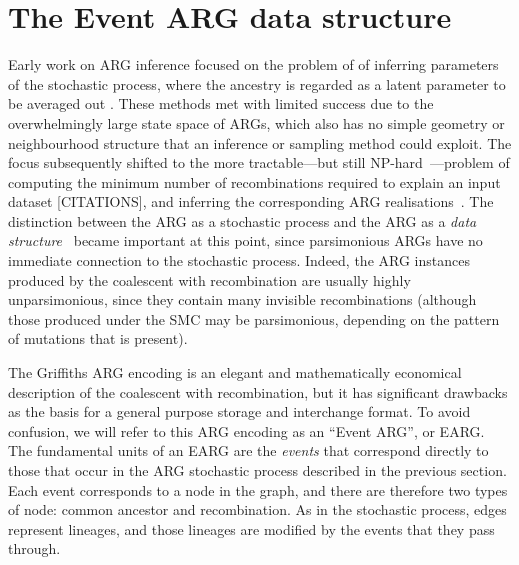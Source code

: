 \documentclass{article}
\begin{document}
\section*{The Event ARG data structure}
Early work on ARG inference focused on the problem of
of inferring parameters of the
stochastic process, where the ancestry is regarded as a
latent parameter to be averaged out
\citep[e.g.][]{griffiths1996ancestral,kuhner2000maximum, nielsen2000estimation,
fearnhead2001estimating}.
These methods met with limited success
due to the overwhelmingly large state space of ARGs, which also has
no simple geometry or neighbourhood structure that an inference or
sampling method could exploit.
The focus subsequently shifted to the more
tractable---but still NP-hard~\citep{wang2001perfect}---problem of computing
the minimum number of recombinations required
to explain an input dataset [CITATIONS], and inferring the corresponding
ARG realisations~\citep{song2003parsimonious,song2005efficient,lyngso2005minimum}.
The distinction between the ARG as a stochastic process
and the ARG as a \emph{data structure}~\citep{minichiello2006mapping}
became important at this point,
since parsimonious ARGs have no immediate connection to
the stochastic process. Indeed, the ARG instances produced by
the coalescent with recombination are usually highly unparsimonious,
since they contain many invisible recombinations
(although those produced under the SMC may be parsimonious, depending
on the pattern of mutations that is present).

The Griffiths ARG encoding is an elegant and mathematically
economical description of the coalescent with recombination,
but it has significant drawbacks as the basis for a general purpose
storage and interchange format. To avoid confusion, we will refer to this
ARG encoding as an ``Event ARG'', or EARG.
The fundamental units of an EARG are the \emph{events} that correspond directly
to those that
occur in the ARG stochastic process described in the previous section.
Each event corresponds to a node in the graph, and there are therefore
two types of node: common ancestor and recombination. As in the
stochastic process, edges represent lineages, and those lineages
are modified by the events that they pass through.
\end{document}
